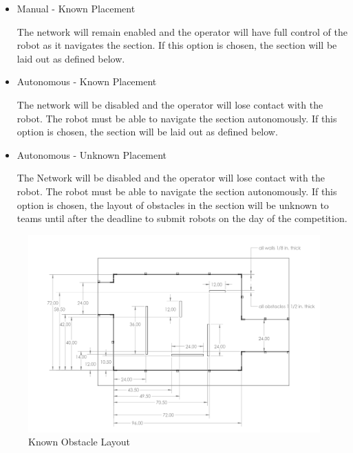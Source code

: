 \begin{itemize}
    \item Manual - Known Placement
    
        The network will remain enabled and the operator will have full control of the robot as it navigates the section. If this option is chosen, the section will be laid out as defined below.
    \item Autonomous - Known Placement
    
        The network will be disabled and the operator will lose contact with the robot. The robot must be able to navigate the section autonomously. If this option is chosen, the section will be laid out as defined below.
    \item Autonomous - Unknown Placement
    
        The Network will be disabled and the operator will lose contact with the robot. The robot must be able to navigate the section autonomously. If this option is chosen, the layout of obstacles in the section will be unknown to teams until after the deadline to submit robots on the day of the competition. 
        
\end{itemize}

\begin{figure}[H]
	\centering
	\includegraphics[width=.95\textwidth]{images/avoidance_overview.png}
	\caption{Known Obstacle Layout}
	\label{fig:avoidance_overview} 
\end{figure}